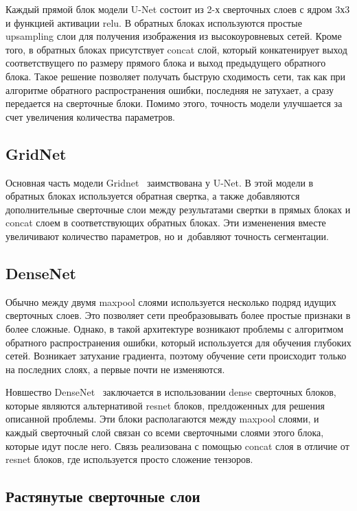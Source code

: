 Каждый прямой блок модели U-Net состоит из 2-х сверточных слоев с ядром 3х3 и функцией активации relu. В обратных блоках используются простые upsampling слои для получения изображения из высокоуровневых сетей. Кроме того, в обратных блоках присутствует concat слой, который конкатенирует выход соответствущего по размеру прямого блока и выход предыдущего обратного блока. Такое решение позволяет получать быструю сходимость сети, так как при алгоритме обратного распространения ошибки, последняя не затухает, а сразу передается на сверточные блоки. Помимо этого, точность модели улучшается за счет увеличения количества параметров.   

\subsection{GridNet}

Основная часть модели Gridnet~\cite{gridnet} заимствована у U-Net. В этой модели в обратных блоках используется обратная свертка, а также добавляются дополнительные сверточные слои между результатами свертки в прямых блоках и concat слоем в соответствующих обратных блоках. Эти измененения вместе увеличивают количество параметров, но и~добавляют точность сегментации.

\subsection{DenseNet}

Обычно между двумя maxpool слоями используется несколько подряд идущих сверточных слоев. Это позволяет сети преобразовывать более простые признаки в более сложные. Однако, в такой архитектуре возникают проблемы с алгоритмом обратного распространения ошибки, который используется для обучения глубоких сетей. Возникает затухание градиента, поэтому обучение сети происходит только на последних слоях, а первые почти не изменяются. 

Новшество DenseNet~\cite{densenet} заключается в использовании dense сверточных блоков, которые являются альтернативой resnet блоков\cite{resnet}, прелдоженных для решения описанной проблемы. Эти блоки располагаются между maxpool слоями, и каждый сверточный слой связан со всеми сверточными слоями этого блока, которые идут после него. Связь реализована с помощью concat слоя в отличие от resnet блоков, где используется просто сложение тензоров.   

\subsection{Растянутые сверточные слои}

